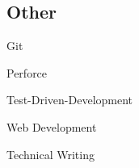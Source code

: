 \documentclass[]{deedy-resume-openfont}
\begin{document}
\begin{minipage}[t]{0.66\textwidth}
\vspace{-1em}
\subsection{Other}
\begin{minipage}[t]{0.45\textwidth}
\begin{tightemize}
\item Git
\item Perforce
\item Test-Driven-Development
\end{tightemize}
\end{minipage}
\hfill
\begin{minipage}[t]{0.45\textwidth}
\begin{tightemize}
\item Web Development
\item Technical Writing
\end{tightemize}
\end{minipage}

\end{minipage} 
\end{document}
